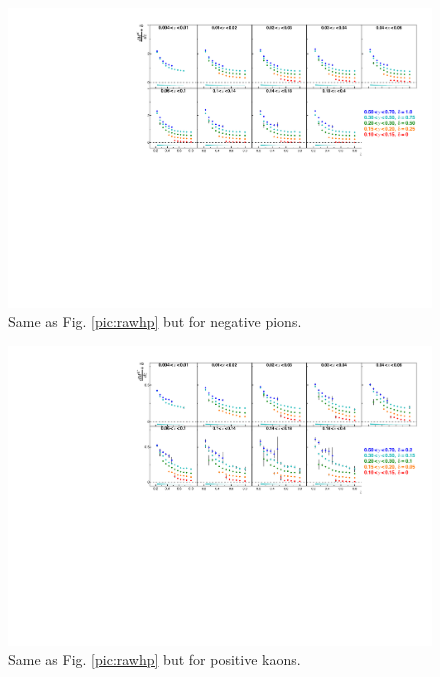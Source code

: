 \begin{figure}[!h]
  \includegraphics[scale=0.85]{./gfx/rawpim.pdf}
  \caption{Same as Fig. \ref{pic:rawhp} but for negative pions.}
  \label{pic:rawpim}
\end{figure}

\begin{figure}[!h]
  \includegraphics[scale=0.85]{./gfx/rawkp.pdf}
  \caption{Same as Fig. \ref{pic:rawhp} but for positive kaons.}
  \label{pic:rawkp}
\end{figure}

